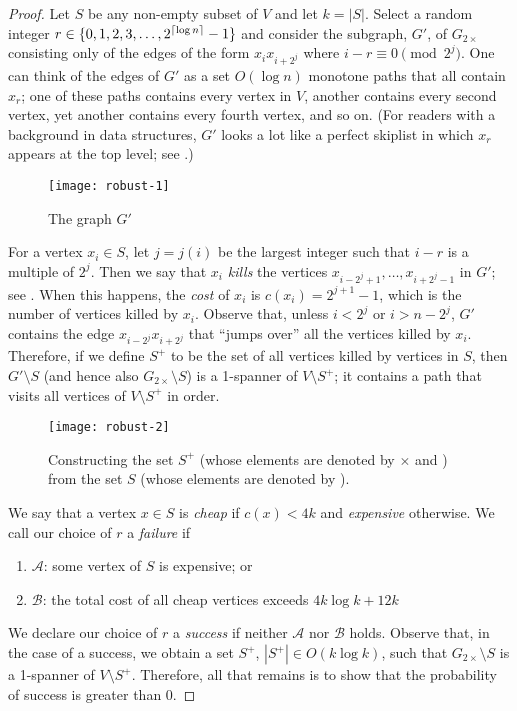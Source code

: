 \documentclass[final]{siamltex}
\begin{document}
\begin{proof}
  Let $S$ be any non-empty subset of $V$ and let $k=|S|$.  Select a
  random integer $r\in\{0,1,2,3,\ldots,2^{{\lceil \log n \rceil}}-1\}$ and
  consider the subgraph, $G'$, of $G_{2\times}$ consisting only of
  the edges of the form $x_ix_{i+2^j}$ where $i-r\equiv 0\pmod{2^j}$.
  One can think of the edges of $G'$ as a set $O(\log n)$ monotone paths
  that all contain $x_r$; one of these paths contains every vertex in $V$,
  another contains every second vertex, yet another contains every fourth
  vertex, and so on.  (For readers with a background in data structures,
  $G'$ looks a lot like a perfect skiplist in which $x_r$
  appears at the top level; see .)

  \begin{figure}
    \begin{center}
      \texttt{[image: robust-1]}
    \end{center}
    \caption{The graph $G'$}
  \end{figure}

  For a vertex $x_i\in S$, let $j=j(i)$ be the largest integer such that
  $i-r$ is a multiple of $2^j$.  Then we say that $x_i$ \emph{kills}
  the vertices $x_{i-2^{j}+1},\ldots,x_{i+2^{j}-1}$ in $G'$; see
  .  When this happens, the \emph{cost} of $x_i$ is
  $c(x_i)=2^{j+1}-1$, which is the number of vertices killed by $x_i$.
  Observe that, unless $i<2^{j}$ or $i>n-2^{j}$, $G'$ contains the
  edge $x_{i-2^{j}}x_{i+2^{j}}$ that ``jumps over'' all the vertices
  killed by $x_i$.  Therefore, if we define $S^+$ to be the set of all
  vertices killed by vertices in $S$, then $G'\setminus S$ (and hence
  also $G_{2\times}\setminus S$) is a 1-spanner of $V\setminus S^+$; it
  contains a path that visits all vertices of $V\setminus S^+$ in order.
  
  \begin{figure}
    \begin{center}
      \texttt{[image: robust-2]}
    \end{center}
    \caption{Constructing the set $S^+$ (whose elements are denoted
    by $\times$ and \textbullet)
      from the set $S$ (whose elements are denoted by \textbullet).}
  \end{figure}
  
  We say that a vertex $x\in S$ is \emph{cheap} if $c(x) < 4k$ and
  \emph{expensive} otherwise.  We call our choice of $r$ a \emph{failure}
  if
  \begin{enumerate}
    \item $\mathcal{A}$: some vertex of $S$ is expensive; or
    \item $\mathcal{B}$: the total cost of all cheap vertices exceeds
      $4k\log k+12k$
  \end{enumerate}
  We declare our choice of $r$ a \emph{success} if neither
  $\mathcal{A}$ nor $\mathcal{B}$ holds.  Observe that, in the case
  of a success, we obtain a set $S^+$, $|S^+|\in O(k\log k)$, such that
  $G_{2\times}\setminus S$ is a 1-spanner of $V\setminus S^+$.  Therefore,
  all that remains is to show that the probability of success is greater
  than 0.
  

\end{proof}
\end{document}
